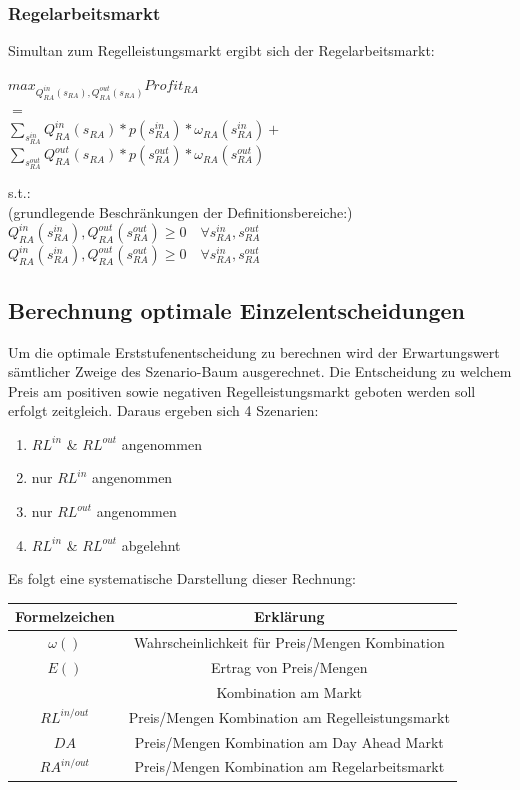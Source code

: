 \documentclass{article}
\begin{document}
\subsubsection{Regelarbeitsmarkt}
Simultan zum Regelleistungsmarkt ergibt sich der Regelarbeitsmarkt:
\begin{center}
	$max_{Q^{in}_{RA}(s_{RA}), Q^{out}_{RA}(s_{RA})} Profit_{RA}$\\ 
	$=$\\
	$\sum_{s^{in}_{RA}} Q^{in}_{RA}(s_{RA}) * p(s^{in}_{RA}) * \omega_{RA}(s^{in}_{RA}) +$\\
	$\sum_{s^{out}_{RA}} Q^{out}_{RA}(s_{RA}) * p(s^{out}_{RA}) * \omega_{RA}(s^{out}_{RA})$\\
\end{center}
s.t.:\\
	(grundlegende Beschränkungen der Definitionsbereiche:)\\
	$Q^{in}_{RA}(s^{in}_{RA}),Q^{out}_{RA}(s^{out}_{RA}) \geq 0 \quad\forall s^{in}_{RA},s^{out}_{RA} $\\
	$Q^{in}_{RA}(s^{in}_{RA}),Q^{out}_{RA}(s^{out}_{RA}) \geq 0\quad\forall  s^{in}_{RA},s^{out}_{RA} $\\

\subsection{Berechnung optimale Einzelentscheidungen}
Um die optimale Erststufenentscheidung zu berechnen wird der Erwartungswert sämtlicher Zweige des Szenario-Baum ausgerechnet.
Die Entscheidung zu welchem Preis am positiven sowie negativen Regelleistungsmarkt geboten werden soll erfolgt zeitgleich.
Daraus ergeben sich 4 Szenarien:
\begin{enumerate}
    \item $RL^{in}$ \& $RL^{out}$ angenommen
    \item nur $RL^{in}$ angenommen
    \item nur $RL^{out}$ angenommen
    \item $RL^{in}$ \& $RL^{out}$ abgelehnt
\end{enumerate}
Es folgt eine systematische Darstellung dieser Rechnung:

    \begin{tabular}{|c|c|}
     \hline
     Formelzeichen & Erklärung \\
      \hline
        $\omega()$ & Wahrscheinlichkeit für Preis/Mengen Kombination \\
       $E()$  &  Ertrag von Preis/Mengen \\
        &   Kombination am Markt \\
       $RL^{in/out}$  &Preis/Mengen Kombination am Regelleistungsmarkt\\ 
       $DA$  & Preis/Mengen Kombination am Day Ahead Markt\\ 
       $RA^{in/out}$  & Preis/Mengen Kombination am Regelarbeitsmarkt\\
        \hline
    \end{tabular}
    \caption{}
    \label{tab:my_label}
\end{document}
